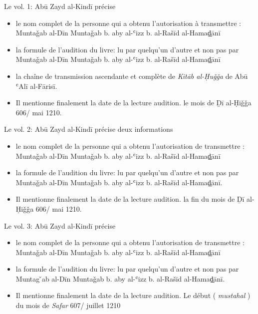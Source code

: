 \documentclass[a4paper,12pt]{report}
\begin{document}
 Le vol. 1:  Abū Zayd al-Kind\=i précise 

\begin{itemize}
    

    \item le nom complet de la personne qui a obtenu l'autorisation à transmettre :  Muntaǧab al-Dīn  Muntaǧab b. aby al-ʿizz b. al-Rašīd al-Hamaḏ̠ānī

\item  la formule de l'audition du livre: lu par quelqu'un d'autre et non pas par  Muntaǧab al-Dīn  Muntaǧab b. aby al-ʿizz b. al-Rašīd al-Hamaḏ̠ān\=i

\item la chaîne de  transmission ascendante et complète de \textit{Kitāb al-Ḥuǧǧa} de Abū ʿAlī al-Fārisī. 

\item  Il mentionne finalement   la date de la lecture audition. le mois de  Ḏī
al-Ḥiǧǧa 606/ mai 1210. 

\end{itemize}


 Le vol. 2:  Abū Zayd al-Kind\=i précise deux informations

\begin{itemize}

 \item le nom complet de la personne qui a obtenu l'autorisation de transmettre :  Muntaǧab al-Dīn  Muntaǧab b. aby al-ʿizz b. al-Rašīd al-Hamaḏ̠ān\=i
 
    \item  la formule de l'audition du livre: lu par quelqu'un d'autre et non pas  par Muntaǧab al-Dīn  Muntaǧab b. aby al-ʿizz b. al-Rašīd al-Hamaḏ̠ān\=i.

\item Il mentionne finalement  la date de la lecture audition. la fin du mois de  Ḏī
al-Ḥiǧǧa 606/ mai 1210. 

\end{itemize}

 Le vol. 3:  Abū Zayd al-Kind\=i précise

\begin{itemize}
     \item le nom complet de la personne qui a obtenu l'autorisation de transmettre :  Muntaǧab al-Dīn  Muntaǧab b. aby al-ʿizz b. al-Rašīd al-Hamaḏ̠ān\=i
\item  la formule de l'audition du livre: lu par quelqu'un d'autre et non pas  par Muntag
̌ab al-Dīn  Muntaǧab b. aby al-ʿizz b. al-Rašīd al-Hamaḏ̠ān\=i.

\item Il mentionne finalement  la date de la lecture audition. Le début ( \textit{mustahal} ) du mois de \textit{Safar} 607/ juillet 1210
     
\end{itemize}
\end{document}
